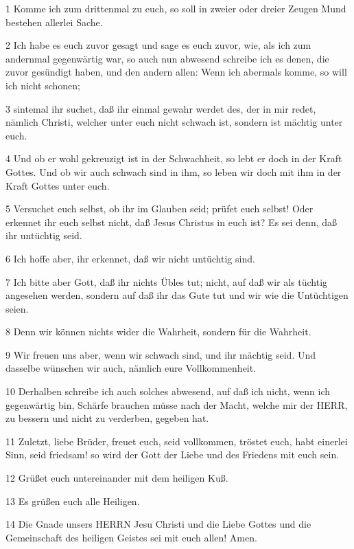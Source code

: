 \par 1 Komme ich zum drittenmal zu euch, so soll in zweier oder dreier Zeugen Mund bestehen allerlei Sache.
\par 2 Ich habe es euch zuvor gesagt und sage es euch zuvor, wie, als ich zum andernmal gegenwärtig war, so auch nun abwesend schreibe ich es denen, die zuvor gesündigt haben, und den andern allen: Wenn ich abermals komme, so will ich nicht schonen;
\par 3 sintemal ihr suchet, daß ihr einmal gewahr werdet des, der in mir redet, nämlich Christi, welcher unter euch nicht schwach ist, sondern ist mächtig unter euch.
\par 4 Und ob er wohl gekreuzigt ist in der Schwachheit, so lebt er doch in der Kraft Gottes. Und ob wir auch schwach sind in ihm, so leben wir doch mit ihm in der Kraft Gottes unter euch.
\par 5 Versuchet euch selbst, ob ihr im Glauben seid; prüfet euch selbst! Oder erkennet ihr euch selbst nicht, daß Jesus Christus in euch ist? Es sei denn, daß ihr untüchtig seid.
\par 6 Ich hoffe aber, ihr erkennet, daß wir nicht untüchtig sind.
\par 7 Ich bitte aber Gott, daß ihr nichts Übles tut; nicht, auf daß wir als tüchtig angesehen werden, sondern auf daß ihr das Gute tut und wir wie die Untüchtigen seien.
\par 8 Denn wir können nichts wider die Wahrheit, sondern für die Wahrheit.
\par 9 Wir freuen uns aber, wenn wir schwach sind, und ihr mächtig seid. Und dasselbe wünschen wir auch, nämlich eure Vollkommenheit.
\par 10 Derhalben schreibe ich auch solches abwesend, auf daß ich nicht, wenn ich gegenwärtig bin, Schärfe brauchen müsse nach der Macht, welche mir der HERR, zu bessern und nicht zu verderben, gegeben hat.
\par 11 Zuletzt, liebe Brüder, freuet euch, seid vollkommen, tröstet euch, habt einerlei Sinn, seid friedsam! so wird der Gott der Liebe und des Friedens mit euch sein.
\par 12 Grüßet euch untereinander mit dem heiligen Kuß.
\par 13 Es grüßen euch alle Heiligen.
\par 14 Die Gnade unsers HERRN Jesu Christi und die Liebe Gottes und die Gemeinschaft des heiligen Geistes sei mit euch allen! Amen.

